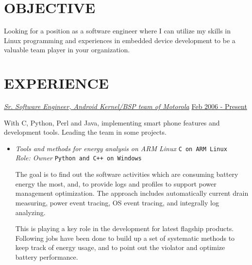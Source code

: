 \documentclass{res}
\begin{document}
\thispagestyle{empty} %

\address{111 South Busey Avenue Apt 5, Urbana, IL 61801\\
  (217)898-3636\\
  pengliu2@illinois.edu}

\begin{resume}
  \vspace{0.1in}

  \section{OBJECTIVE}
  \vspace{0.1in}
  Looking for a position as a software engineer where I can utilize my skills in Linux programming and experiences in embedded device development to be a valuable team player in your organization.

  \section{EXPERIENCE}
  \uline{{\sl Sr. Software Engineer, Android Kernel/BSP team of Motorola}} \hfill \uline{Feb 2006 - Present}

  With C, Python, Perl and Java, implementing smart phone features and development tools. Leading the team in some projects.

  \begin{itemize}
  \item {{\sl Tools and methods for energy analysis on ARM Linux }} \hfill \texttt{C on ARM Linux}\\
    {\sl Role: Owner}                                               \hfill \texttt{Python and C++ on Windows}

    The goal is to find out the software activities which are consuming battery energy the most, and, to provide logs and profiles to support power management optimization. The approach includes automatically current drain measuring, power event tracing, OS event tracing, and integrally log analyzing. 

    This is playing a key role in the development for latest flagship products. Following jobs have been done to build up a set of systematic methods to keep track of energy usage, and to point out the violator and optimize battery performance.


\end{itemize}
\end{resume}
\end{document}
